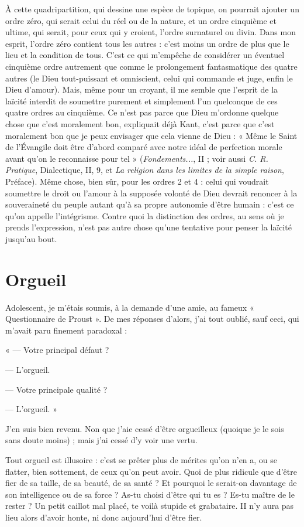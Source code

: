 À cette quadripartition, qui dessine une espèce de topique, on pourrait
ajouter un ordre zéro, qui serait celui du réel ou de la nature, et un ordre cinquième
et ultime, qui serait, pour ceux qui y croient, l’ordre surnaturel ou
divin. Dans mon esprit, l’ordre zéro contient tous les autres : c’est moins un
ordre de plus que le lieu et la condition de tous. C’est ce qui m’empêche de
considérer un éventuel cinquième ordre autrement que comme le prolongement
fantasmatique des quatre autres (le Dieu tout-puissant et omniscient,
celui qui commande et juge, enfin le Dieu d’amour). Mais, même pour un
croyant, il me semble que l'esprit de la laïcité interdit de soumettre purement
et simplement l’un quelconque de ces quatre ordres au cinquième. Ce n’est pas
parce que Dieu m’ordonne quelque chose que c’est moralement bon, expliquait
déjà Kant, c’est parce que c’est moralement bon que je peux envisager
que cela vienne de Dieu : « Même le Saint de l'Évangile doit être d’abord comparé
avec notre idéal de perfection morale avant qu’on le reconnaisse pour tel »
({\it Fondements...}, II ; voir aussi {\it C. R. Pratique}, Dialectique, II, 9, et {\it La religion
dans les limites de la simple raison}, Préface). Même chose, bien sûr, pour les
ordres 2 et 4 : celui qui voudrait soumettre le droit ou l’amour à la supposée
volonté de Dieu devrait renoncer à la souveraineté du peuple autant qu’à sa
propre autonomie d’être humain : c’est ce qu’on appelle l’intégrisme. Contre
quoi la distinction des ordres, au sens où je prends l’expression, n’est pas autre
chose qu’une tentative pour penser la laïcité jusqu’au bout.

\section{Orgueil}
Adolescent, je m'étais soumis, à la demande d’une amie, au
fameux « Questionnaire de Proust ». De mes réponses d’alors,
j'ai tout oublié, sauf ceci, qui m’avait paru finement paradoxal :

« — Votre principal défaut ?

— L’orgueil.

— Votre principale qualité ?

— L’orgueil. »

J'en suis bien revenu. Non que j'aie cessé d’être orgueilleux (quoique je le
sois sans doute moins) ; mais j’ai cessé d’y voir une vertu.

Tout orgueil est illusoire : c’est se prêter plus de mérites qu’on n’en a, ou se
flatter, bien sottement, de ceux qu’on peut avoir. Quoi de plus ridicule que
d’être fier de sa taille, de sa beauté, de sa santé ? Et pourquoi le serait-on davantage
de son intelligence ou de sa force ? As-tu choisi d’être qui tu es ? Es-tu
maître de le rester ? Un petit caillot mal placé, te voilà stupide et grabataire. II
n’y aura pas lieu alors d’avoir honte, ni donc aujourd’hui d’être fier.

